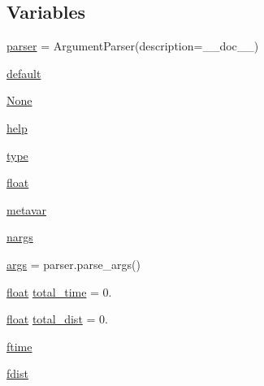 \subsection*{Variables}
\begin{DoxyCompactItemize}
\item 
\mbox{\hyperlink{namespacepymavlink_1_1tools_1_1mavflighttime_a445972028a7b3011b1dc0a5fd7a9abc6}{parser}} = Argument\+Parser(description=\+\_\+\+\_\+doc\+\_\+\+\_\+)
\item 
\mbox{\hyperlink{namespacepymavlink_1_1tools_1_1mavflighttime_ab75a1ed8e25c5245fac9b3e3dd9011d5}{default}}
\item 
\mbox{\hyperlink{namespacepymavlink_1_1tools_1_1mavflighttime_a746257244d528c2f1fb646a7cd0669d0}{None}}
\item 
\mbox{\hyperlink{namespacepymavlink_1_1tools_1_1mavflighttime_a41de75952c67c5e85441852a67862336}{help}}
\item 
\mbox{\hyperlink{namespacepymavlink_1_1tools_1_1mavflighttime_ab9aeb28d56aee4aa9d335cded64123ec}{type}}
\item 
\mbox{\hyperlink{namespacepymavlink_1_1tools_1_1mavflighttime_ab1fedea2ca1882ff7e060f44f8048885}{float}}
\item 
\mbox{\hyperlink{namespacepymavlink_1_1tools_1_1mavflighttime_a41f141ce0eea4ef3e87cca685c6ea9f6}{metavar}}
\item 
\mbox{\hyperlink{namespacepymavlink_1_1tools_1_1mavflighttime_a027b23446ac2b69d2941ded7c49d50c3}{nargs}}
\item 
\mbox{\hyperlink{namespacepymavlink_1_1tools_1_1mavflighttime_a204d9242d26e222235baa22da7808820}{args}} = parser.\+parse\+\_\+args()
\item 
\mbox{\hyperlink{namespacepymavlink_1_1tools_1_1mavflighttime_ab1fedea2ca1882ff7e060f44f8048885}{float}} \mbox{\hyperlink{namespacepymavlink_1_1tools_1_1mavflighttime_a3ee5454b529e2f7f9985884461827257}{total\+\_\+time}} = 0.
\item 
\mbox{\hyperlink{namespacepymavlink_1_1tools_1_1mavflighttime_ab1fedea2ca1882ff7e060f44f8048885}{float}} \mbox{\hyperlink{namespacepymavlink_1_1tools_1_1mavflighttime_afaa3f1a3fc0e84f459a2ca1dc610b675}{total\+\_\+dist}} = 0.
\item 
\mbox{\hyperlink{namespacepymavlink_1_1tools_1_1mavflighttime_a81d150a709fc078862f38f5fe22a3edf}{ftime}}
\item 
\mbox{\hyperlink{namespacepymavlink_1_1tools_1_1mavflighttime_a58110227862890831ae4bd03a0491f36}{fdist}}
\end{DoxyCompactItemize}



